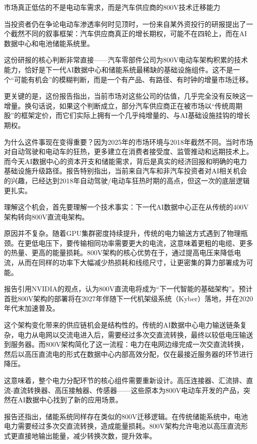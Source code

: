 \documentclass[11pt]{ctexart}
\begin{document}
市场真正低估的不是电动车需求，而是汽车供应商的800V技术迁移能力

当投资者仍在争论电动车渗透率何时见顶时，一份来自某外资投行的研报提出了一个截然不同的叙事框架：汽车供应商真正的增长期权，可能不在四轮上，而在AI数据中心和电池储能系统里。

这份研报的核心判断非常直接——汽车零部件公司为800V电动车架构积累的技术能力，恰好是下一代AI数据中心和储能系统最稀缺的基础设施组件。这不是一个“可能有机会”的模糊判断，而是一个有产品、有路径、有时钟的增量市场迁移。

更关键的是，这份报告指出，当前市场对这些公司的估值，几乎完全没有反映这一增量。换句话说，如果这个判断成立，部分汽车供应商正在被市场以“传统周期股”的框架定价，而它们实际上拥有一个几乎纯增量的、与AI基础设施挂钩的增长期权。

为什么这件事现在变得重要？因为2025年的市场环境与2018年截然不同。当时市场对自动驾驶和电动车的狂热，更多建立在消费者接受度、监管推动和远期技术上。而今天AI数据中心的资本开支和储能需求，背后是真实的经济回报和明确的电力基础设施升级路径。报告特别指出，当前来自汽车和非汽车投资者对AI相关机会的兴趣，已经达到2018年自动驾驶/电动车狂热时期的高点，但这一次的底层逻辑更扎实。

理解这个机会，首先要理解一个技术事实：下一代AI数据中心正在从传统的400V架构转向800V直流电架构。

原因并不复杂。随着GPU集群密度持续提升，传统的电力输送方式遇到了物理瓶颈。在更低电压下，要传输相同功率需要更大的电流，这意味着更粗的电缆、更多的热量、更高的能量损耗。800V架构的核心优势在于，通过提高电压来降低电流，从而在同样的功率下大幅减少热损耗和线缆尺寸，让更密集的算力部署成为可能。

报告引用NVIDIA的观点，认为800V直流电将成为“下一代智能的基础架构”。预计首批800V架构的部署将在2027年伴随下一代机架级系统（Kyber）落地，并在2020年代末加速普及。

这个架构变化带来的供应链机会是结构性的。传统的AI数据中心电力输送链条复杂，电力从电网以交流电进入后，需要经过多次交直流转换，最终以较低电压输送到服务器。而800V架构简化了这一流程：电力在电网边缘完成一次交直流转换，然后以高压直流电的形式在数据中心内部高效分配，仅在最接近服务器的环节进行降压。

这意味着，整个电力分配环节的核心组件需要重新设计。高压连接器、汇流排、直流-直流转换器、高压接触器、传感器——这些原本为800V电动车开发的产品，突然在AI数据中心找到了新的应用场景。

报告还指出，储能系统同样存在类似的800V迁移逻辑。在传统储能系统中，电池电力需要经过多次交直流转换，造成能量损耗。800V架构允许电池以高压直流形式更直接地输出能量，减少转换次数，提升效率。
\end{document}
